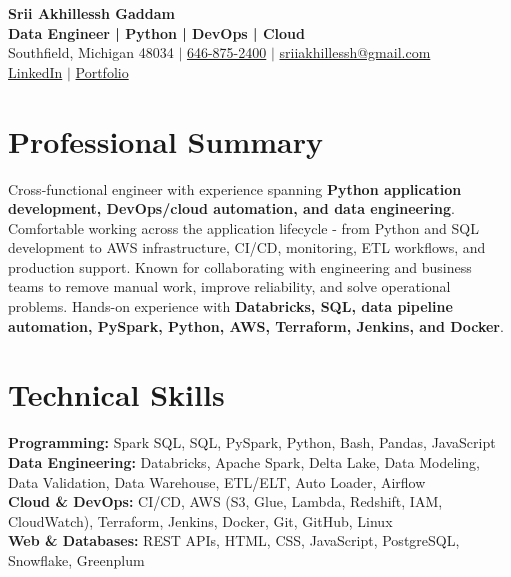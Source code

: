 \documentclass[letterpaper,10pt]{article}
\begin{document}
\fontsize{9.35pt}{10.45pt}\selectfont

\begin{center}
    {\LARGE \textbf{Srii Akhillessh Gaddam}} \\[-1pt]
    \textbf{Data Engineer | Python | DevOps | Cloud} \\[2pt]
    Southfield, Michigan 48034 $|$
    \href{tel:6468752400}{646-875-2400} $|$
    \href{mailto:sriiakhillessh@gmail.com}{sriiakhillessh@gmail.com} \\[1pt]
    \href{https://www.linkedin.com/in/srii-akhiilessh-gaddam-b48668191/}{LinkedIn} $|$
    \href{https://sriiakhillesshg.github.io/portfolio/}{Portfolio}
\end{center}
\vspace{-8pt}

\section{Professional Summary}
\small{Cross-functional engineer with experience spanning \textbf{Python application development, DevOps/cloud automation, and data engineering}. Comfortable working across the application lifecycle - from Python and SQL development to AWS infrastructure, CI/CD, monitoring, ETL workflows, and production support. Known for collaborating with engineering and business teams to remove manual work, improve reliability, and solve operational problems. Hands-on experience with \textbf{Databricks, SQL, data pipeline automation, PySpark, Python, AWS, Terraform, Jenkins, and Docker}.}

\section{Technical Skills}
\small{
\textbf{Programming:} Spark SQL, SQL, PySpark, Python, Bash, Pandas, JavaScript \\
\textbf{Data Engineering:} Databricks, Apache Spark, Delta Lake, Data Modeling, Data Validation, Data Warehouse, ETL/ELT, Auto Loader, Airflow \\
\textbf{Cloud \& DevOps:} CI/CD, AWS (S3, Glue, Lambda, Redshift, IAM, CloudWatch), Terraform, Jenkins, Docker, Git, GitHub, Linux \\
\textbf{Web \& Databases:} REST APIs, HTML, CSS, JavaScript, PostgreSQL, Snowflake, Greenplum
}
\end{document}

